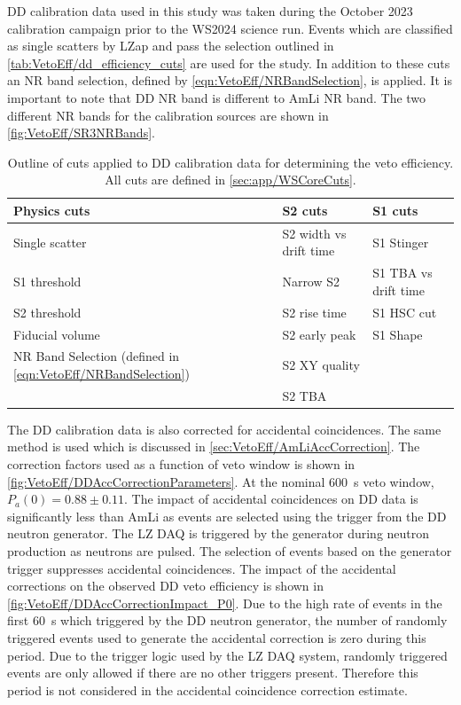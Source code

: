 DD calibration data used in this study was taken during the October 2023 calibration campaign prior to the WS2024 science run. Events which are classified as single scatters by LZap and pass the selection outlined in \autoref{tab:VetoEff/dd_efficiency_cuts} are used for the study. In addition to these cuts an NR band selection, defined by \autoref{eqn:VetoEff/NRBandSelection}, is applied. It is important to note that DD NR band is different to AmLi NR band. The two different NR bands for the calibration sources are shown in \autoref{fig:VetoEff/SR3NRBands}.

\begin{table}[!ht]
	\centering
	\caption{Outline of cuts applied to DD calibration data for determining the veto efficiency. All cuts are defined in \autoref{sec:app/WSCoreCuts}.}
	\begin{tabular}{lll}
    \hline\hline
	\textbf{Physics cuts}&\textbf{S2 cuts}&\textbf{S1 cuts} \\
	\hline
	Single scatter & S2 width vs drift time & S1 Stinger \\
	S1 threshold & Narrow S2 & S1 TBA vs drift time  \\
	S2 threshold & S2 rise time & S1 HSC cut \\
    Fiducial volume & S2 early peak & S1 Shape \\
	NR Band Selection (defined in \autoref{eqn:VetoEff/NRBandSelection})& S2 XY quality & \\
	& S2 TBA & \\
    \hline\hline
	\end{tabular}
	\label{tab:VetoEff/dd_efficiency_cuts}
\end{table}
The DD calibration data is also corrected for accidental coincidences. The same method is used which is discussed in \autoref{sec:VetoEff/AmLiAccCorrection}. The correction factors used as a function of veto window is shown in \autoref{fig:VetoEff/DDAccCorrectionParameters}. At the nominal 600~\textmu s veto window, $P_a(0)=0.88\pm0.11$. The impact of accidental coincidences on DD data is significantly less than AmLi as events are selected using the trigger from the DD neutron generator. The LZ DAQ is triggered by the generator during neutron production as neutrons are pulsed. The selection of events based on the generator trigger suppresses accidental coincidences. The impact of the accidental corrections on the observed DD veto efficiency is shown in \autoref{fig:VetoEff/DDAccCorrectionImpact_P0}. Due to the high rate of events in the first 60~\textmu s which triggered by the DD neutron generator, the number of randomly triggered events used to generate the accidental correction is zero during this period. Due to the trigger logic used by the LZ DAQ system, randomly triggered events are only allowed if there are no other triggers present. Therefore this period is not considered in the accidental coincidence correction estimate.
